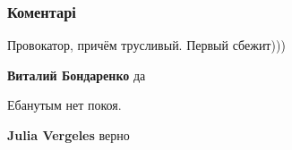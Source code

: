  
 
 
 
 
\subsubsection{Коментарі}

\begin{itemize}
 
Провокатор, причём трусливый. Первый сбежит)))

\begin{itemize}
 
\textbf{Виталий Бондаренко} да
\end{itemize}

 
Ебанутым нет покоя.

\begin{itemize}
 
\textbf{Julia Vergeles} верно
\end{itemize}

 

\end{itemize}
